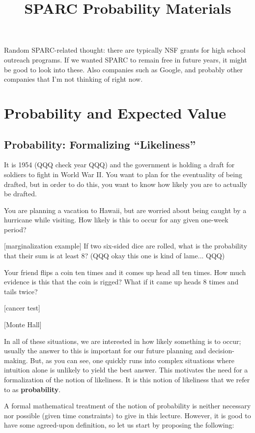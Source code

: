 \documentclass[11pt]{article}
\title{SPARC Probability Materials}
\begin{document}
\maketitle

Random SPARC-related thought: there are typically NSF grants for high school outreach programs. If we wanted SPARC to remain free in future years, it might be good to look into these. Also companies such as Google, and probably other companies that I'm not thinking of right now.

\section{Probability and Expected Value}
\subsection{Probability: Formalizing ``Likeliness''}

It is 1954 (QQQ check year QQQ) and the government is holding a draft for soldiers to fight in World War II. You want to plan for the eventuality of being drafted, but in order to do this, you want to know how likely you are to actually be drafted.

You are planning a vacation to Hawaii, but are worried about being caught by a hurricane while visiting. How likely is this to occur for any given one-week period?

[marginalization example] If two six-sided dice are rolled, what is the probability that their sum is at least $8$? (QQQ okay this one is kind of lame... QQQ)


Your friend flips a coin ten times and it comes up head all ten times. How much evidence is this that the coin is rigged? What if it came up heads 8 times and tails twice?

[cancer test]

[Monte Hall]

In all of these situations, we are interested in how likely something is to occur; usually the answer to this is important for our future planning and decision-making. But, as you can see, one quickly runs into complex situations where intuition alone is unlikely to yield the best answer. This motivates the need for a formalization of the notion of likeliness. It is this notion of likeliness that we refer to as \textbf{probability}.

A formal mathematical treatment of the notion of probability is neither necessary nor possible (given time constraints) to give in this lecture. However, it is good to have some agreed-upon definition, so let us start by proposing the following:
\end{document}
